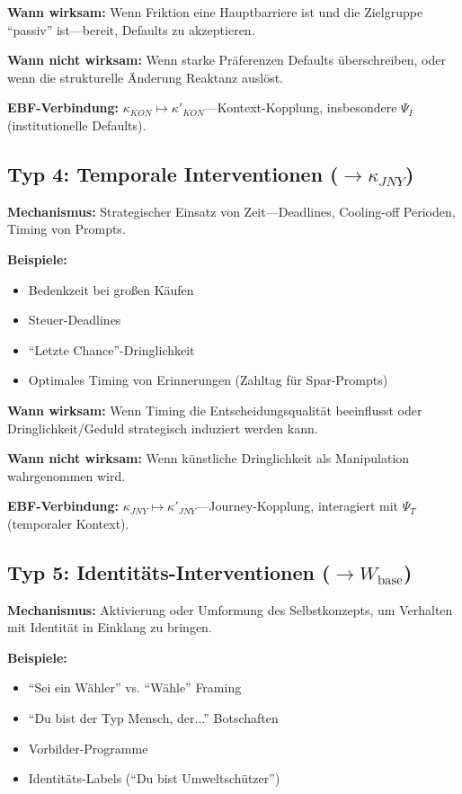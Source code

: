 \textbf{Wann wirksam:} Wenn Friktion eine Hauptbarriere ist und die Zielgruppe ``passiv'' ist---bereit, Defaults zu akzeptieren.

\textbf{Wann nicht wirksam:} Wenn starke Präferenzen Defaults überschreiben, oder wenn die strukturelle Änderung Reaktanz auslöst.

\textbf{EBF-Verbindung:} $\kappa_{KON} \mapsto \kappa'_{KON}$---Kontext-Kopplung, insbesondere $\Psi_I$ (institutionelle Defaults).


\subsection{Typ 4: Temporale Interventionen ($\rightarrow \kappa_{JNY}$)}
\label{sec:17-type-temporal}

\textbf{Mechanismus:} Strategischer Einsatz von Zeit---Deadlines, Cooling-off Perioden, Timing von Prompts.

\textbf{Beispiele:}
\begin{itemize}[nosep]
\item Bedenkzeit bei großen Käufen
\item Steuer-Deadlines
\item ``Letzte Chance''-Dringlichkeit
\item Optimales Timing von Erinnerungen (Zahltag für Spar-Prompts)
\end{itemize}

\textbf{Wann wirksam:} Wenn Timing die Entscheidungsqualität beeinflusst oder Dringlichkeit/Geduld strategisch induziert werden kann.

\textbf{Wann nicht wirksam:} Wenn künstliche Dringlichkeit als Manipulation wahrgenommen wird.

\textbf{EBF-Verbindung:} $\kappa_{JNY} \mapsto \kappa'_{JNY}$---Journey-Kopplung, interagiert mit $\Psi_T$ (temporaler Kontext).


\subsection{Typ 5: Identitäts-Interventionen ($\rightarrow W_{\text{base}}$)}
\label{sec:17-type-identity}

\textbf{Mechanismus:} Aktivierung oder Umformung des Selbstkonzepts, um Verhalten mit Identität in Einklang zu bringen.

\textbf{Beispiele:}
\begin{itemize}[nosep]
\item ``Sei ein Wähler'' vs. ``Wähle'' Framing \citep{bryan2011}
\item ``Du bist der Typ Mensch, der...'' Botschaften
\item Vorbilder-Programme
\item Identitäts-Labels (``Du bist Umweltschützer'')
\end{itemize}

